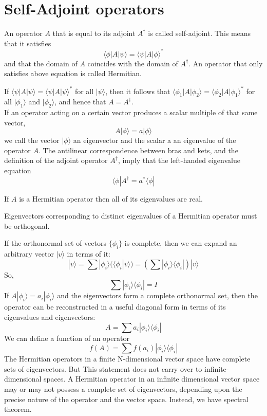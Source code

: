 \section{Self-Adjoint operators}
\begin{newdef}
An operator $A$ that is equal to its adjoint $A^{\dagger}$ is called self-adjoint. This means that it satisfies
\[\langle \phi | A | \psi \rangle  = \langle \psi | A | \phi \rangle^*\]
and that the domain of $A$ coincides with the domain of $A^{\dagger}$. An operator that only satisfies above equation is called Hermitian.
\end{newdef}

\begin{newthem}
If $\langle \psi | A | \psi \rangle  = \langle \psi | A | \psi \rangle^*$ for all $| \psi \rangle$, then it follows that $\langle \phi_1 | A | \phi_2 \rangle  = \langle \phi_2 | A | \phi_1 \rangle^*$ for all $|\phi_1\rangle$ and $|\phi_2\rangle$, and hence that $A = A^{\dagger}$.\\
If an operator acting on a certain vector produces a scalar multiple of that same vector,
\[ A |\phi \rangle = a |\phi \rangle\]
we call the vector $| \phi \rangle$ an eigenvector and the scalar a an eigenvalue of the operator $A$. The antilinear correspondence between bras and kets, and the definition of the adjoint operator $A^{\dagger}$, imply that the left-handed eigenvalue equation
\[\langle \phi | A^{\dagger} = a^{*} \langle \phi |\]
\end{newthem}

\begin{newthem}
 If $A$ is a Hermitian operator then all of its eigenvalues are real.
\end{newthem}

\begin{newthem}
Eigenvectors corresponding to distinct eigenvalues of a Hermitian operator must be orthogonal.
\end{newthem}

\noindent
If the orthonormal set of vectors $\{ \phi_i \}$ is complete, then we can expand an arbitrary vector $|v\rangle$ in terms of it:
\[ |v\rangle = \sum | \phi_i \rangle (\langle \phi_i | v \rangle) = \left( \sum |\phi_i \rangle \langle \phi_i | \right) | v\rangle\]
So,
\[ \sum |\phi_i \rangle \langle \phi_i | = I\]
If $A |\phi_i \rangle = a_i |\phi_i\rangle$ and the eigenvectors form a complete orthonormal set, then the operator can be reconstructed in a useful diagonal form in terms of its eigenvalues and eigenvectors:
\[A = \sum a_i |\phi_i \rangle \langle \phi_i |\]
We can define a function of an operator
\[f(A) =  \sum f(a_i) |\phi_i \rangle \langle \phi_i |\]
The Hermitian operators in a finite N-dimensional vector space have complete sets of eigenvectors. But This statement does not carry over to infinite-dimensional spaces. A Hermitian operator in an infinite dimensional vector space may or may not possess a complete set of eigenvectors, depending upon the precise nature of the operator and the vector space. Instead, we have spectral theorem.

